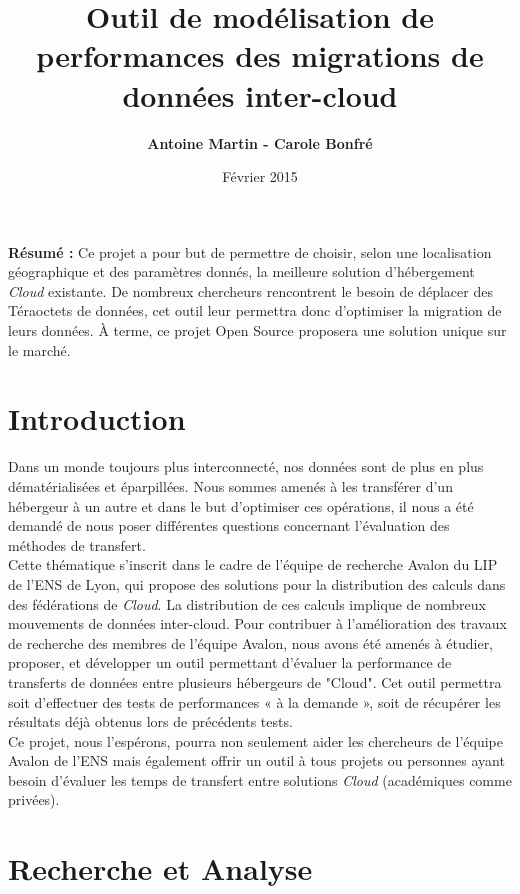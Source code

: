 \documentclass[10pt]{article}
\title{\Huge{Outil de modélisation de performances 
des migrations de données inter-cloud}}
\author{\textbf{Antoine Martin - Carole Bonfré} }
\date{Février 2015}
\begin{document}
\maketitle

\textbf{Résumé : } Ce projet a pour but de permettre de choisir, selon une
localisation géographique et des paramètres donnés, la meilleure solution
d'hébergement \textit{Cloud} existante. De nombreux chercheurs rencontrent le
besoin de déplacer des Téraoctets de données, cet outil leur permettra donc
d'optimiser la migration de leurs données. À terme, ce projet Open Source
proposera une solution unique sur le marché.\\

\section{Introduction}

Dans un monde toujours plus interconnecté, nos données sont de plus en plus
dématérialisées et éparpillées. Nous sommes amenés à les transférer d’un
hébergeur à un autre et dans le but d’optimiser ces opérations, il nous a été
demandé de nous poser différentes questions concernant l’évaluation des
méthodes de transfert.\\ Cette thématique s’inscrit dans le cadre de l’équipe
de recherche Avalon du LIP de l’ENS de Lyon, qui propose des solutions pour la
distribution des calculs dans des fédérations de \textit{Cloud}. La
distribution de ces calculs implique de nombreux mouvements de données
inter-cloud. Pour contribuer à l’amélioration des travaux de recherche des
membres de l’équipe Avalon, nous avons été amenés à étudier, proposer, et
développer un outil permettant d’évaluer la performance de transferts de
données entre plusieurs hébergeurs de "Cloud". Cet outil permettra soit
d’effectuer des tests de performances « à la demande », soit de récupérer les
résultats déjà obtenus lors de précédents tests.\\


Ce projet, nous l’espérons, pourra non seulement aider les chercheurs de
l’équipe Avalon de l’ENS mais également offrir un outil à tous projets ou
personnes ayant besoin d’évaluer les temps de transfert entre solutions
\textit{Cloud} (académiques comme privées).

\section{Recherche et Analyse}
\end{document}
